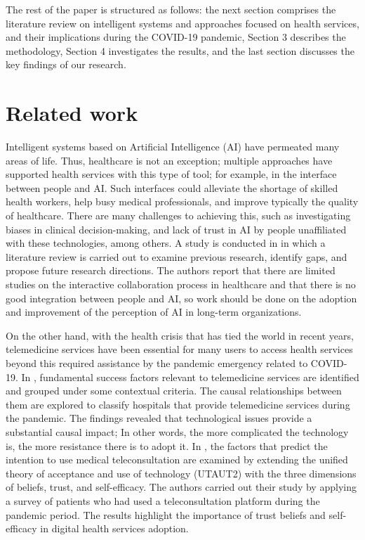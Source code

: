\documentclass[sustainability,article,submit,pdftex,moreauthors]{Definitions/mdpi}
\begin{document}
The rest of the paper is structured as follows: the next section comprises the literature review on intelligent systems and approaches focused on health services, and their implications during the COVID-19 pandemic, Section 3 describes the methodology, Section 4 investigates the results, and the last section discusses the key findings of our research.

\section{Related work}

Intelligent systems based on Artificial Intelligence (AI) have permeated many areas of life. Thus, healthcare is not an exception; multiple approaches have supported health services with this type of tool; for example, in the interface between people and AI. Such interfaces could alleviate the shortage of skilled health workers, help busy medical professionals, and improve typically the quality of healthcare. There are many challenges to achieving this, such as investigating biases in clinical decision-making, and lack of trust in AI by people unaffiliated with these technologies, among others. A study is conducted in \citep{lai2021human} in which a literature review is carried out to examine previous research, identify gaps, and propose future research directions. The authors report that there are limited studies on the interactive collaboration process in healthcare and that there is no good integration between people and AI, so work should be done on the adoption and improvement of the perception of AI in long-term organizations.

On the other hand, with the health crisis that has tied the world in recent years, telemedicine services have been essential for many users to access health services beyond this required assistance by the pandemic emergency related to COVID-19. In \citep{chauhan2022implications}, fundamental success factors relevant to telemedicine services are identified and grouped under some contextual criteria. The causal relationships between them are explored to classify hospitals that provide telemedicine services during the pandemic. The findings revealed that technological issues provide a substantial causal impact; In other words, the more complicated the technology is, the more resistance there is to adopt it. In \citep{baudier2022digital}, the factors that predict the intention to use medical teleconsultation are examined by extending the unified theory of acceptance and use of technology (UTAUT2) with the three dimensions of beliefs, trust, and self-efficacy. The authors carried out their study by applying a survey of patients who had used a teleconsultation platform during the pandemic period. The results highlight the importance of trust beliefs and self-efficacy in digital health services adoption.
\end{document}
